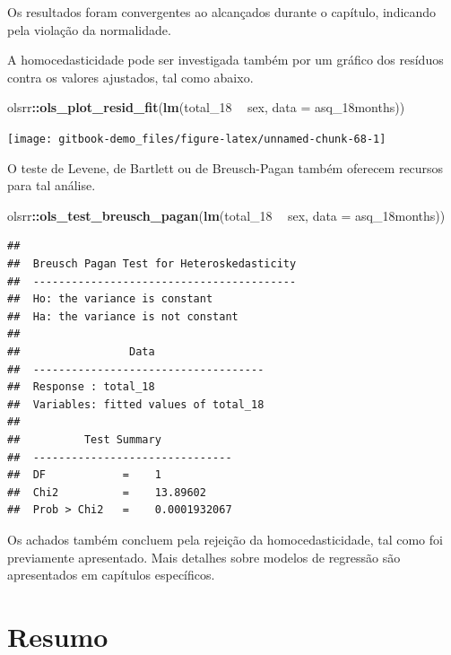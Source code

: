 \documentclass[
]{book}
\newenvironment{Shaded}{\begin{snugshade}}{\end{snugshade}}
\newcommand{\DataTypeTok}[1]{\textcolor[rgb]{0.13,0.29,0.53}{#1}}
\newcommand{\DecValTok}[1]{\textcolor[rgb]{0.00,0.00,0.81}{#1}}
\newcommand{\KeywordTok}[1]{\textcolor[rgb]{0.13,0.29,0.53}{\textbf{#1}}}
\newcommand{\NormalTok}[1]{#1}
\newcommand{\OperatorTok}[1]{\textcolor[rgb]{0.81,0.36,0.00}{\textbf{#1}}}
\newcommand{\StringTok}[1]{\textcolor[rgb]{0.31,0.60,0.02}{#1}}
\begin{document}
Os resultados foram convergentes ao alcançados durante o capítulo, indicando pela violação da normalidade.

A homocedasticidade pode ser investigada também por um gráfico dos resíduos contra os valores ajustados, tal como abaixo.

\begin{Shaded}
\begin{Highlighting}[]
\NormalTok{olsrr}\OperatorTok{::}\KeywordTok{ols_plot_resid_fit}\NormalTok{(}\KeywordTok{lm}\NormalTok{(total_}\DecValTok{18} \OperatorTok{~}\StringTok{ }\NormalTok{sex, }\DataTypeTok{data =}\NormalTok{ asq_18months))}
\end{Highlighting}
\end{Shaded}

\begin{center}\texttt{[image: gitbook-demo\_files/figure-latex/unnamed-chunk-68-1]} \end{center}

O teste de Levene, de Bartlett ou de Breusch-Pagan também oferecem recursos para tal análise.

\begin{Shaded}
\begin{Highlighting}[]
\NormalTok{olsrr}\OperatorTok{::}\KeywordTok{ols_test_breusch_pagan}\NormalTok{(}\KeywordTok{lm}\NormalTok{(total_}\DecValTok{18} \OperatorTok{~}\StringTok{ }\NormalTok{sex, }\DataTypeTok{data =}\NormalTok{ asq_18months))}
\end{Highlighting}
\end{Shaded}

\begin{verbatim}
## 
##  Breusch Pagan Test for Heteroskedasticity
##  -----------------------------------------
##  Ho: the variance is constant            
##  Ha: the variance is not constant        
## 
##                 Data                 
##  ------------------------------------
##  Response : total_18 
##  Variables: fitted values of total_18 
## 
##          Test Summary           
##  -------------------------------
##  DF            =    1 
##  Chi2          =    13.89602 
##  Prob > Chi2   =    0.0001932067
\end{verbatim}

Os achados também concluem pela rejeição da homocedasticidade, tal como foi previamente apresentado. Mais detalhes sobre modelos de regressão são apresentados em capítulos específicos.

\hypertarget{resumo-7}{%
\section{Resumo}\label{resumo-7}}
\end{document}
